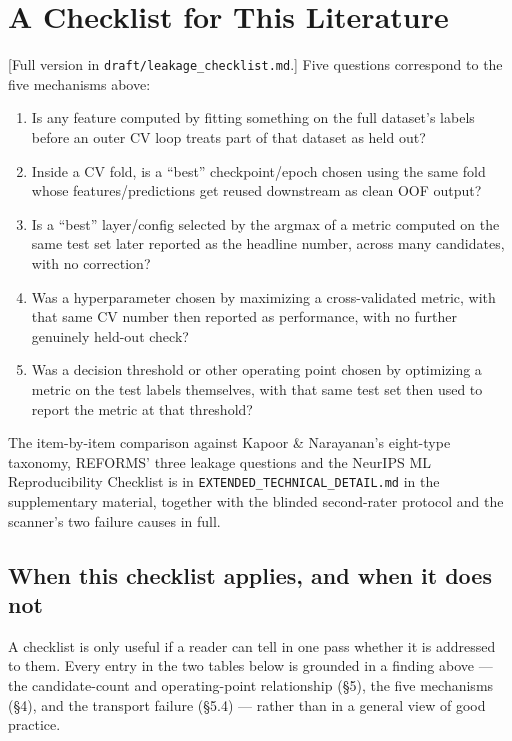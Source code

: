 \documentclass[10pt]{article} %
\begin{document}
\section{A Checklist for This Literature}

[Full version in \texttt{draft/leakage\_checklist.md}.] Five questions
correspond to the five mechanisms above:

\begin{enumerate}
\itemsep0pt
\item Is any feature computed by fitting something on the full dataset's
   labels before an outer CV loop treats part of that dataset as held out?
\item Inside a CV fold, is a ``best'' checkpoint/epoch chosen using the same
   fold whose features/predictions get reused downstream as clean OOF output?
\item Is a ``best'' layer/config selected by the argmax of a metric computed
   on the same test set later reported as the headline number, across many
   candidates, with no correction?
\item Was a hyperparameter chosen by maximizing a cross-validated metric, with
   that same CV number then reported as performance, with no further genuinely
   held-out check?
\item Was a decision threshold or other operating point chosen by optimizing a
   metric on the test labels themselves, with that same test set then used to
   report the metric at that threshold?
\end{enumerate}

The item-by-item comparison against Kapoor \& Narayanan's eight-type taxonomy,
REFORMS' three leakage questions and the NeurIPS ML Reproducibility Checklist
is in \texttt{EXTENDED\_TECHNICAL\_DETAIL.md} in the supplementary material,
together with the blinded second-rater protocol and the scanner's two failure
causes in full.

\subsection{When this checklist applies, and when it does not}
\label{sec:checklist-scope}

A checklist is only useful if a reader can tell in one pass whether it is
addressed to them. Every entry in the two tables below is grounded in a finding
above --- the candidate-count and operating-point relationship (§5), the five
mechanisms (§4), and the transport failure (§5.4) --- rather than in a general
view of good practice.
\end{document}
